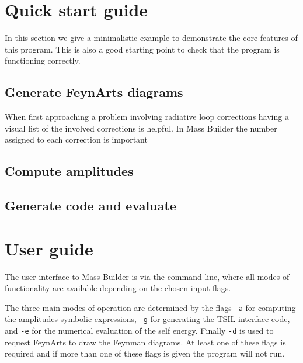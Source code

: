 \section{Quick start guide}

In this section we give a minimalistic example to demonstrate the core features of this program.  This is also a good starting point to check that the program is functioning correctly.

\subsection{Generate FeynArts diagrams}\label{generate_diagrams}

When first approaching a problem involving radiative loop corrections having a visual list of the involved corrections is helpful.  In Mass Builder the number assigned to each correction is important 


\subsection{Compute amplitudes}

\subsection{Generate code and evaluate}


\section{User guide}

The user interface to Mass Builder is via the command line, where all modes of functionality are available depending on the chosen input flags.

The three main modes of operation are determined by the flags \lstinline{-a} for computing the amplitudes symbolic expressions, \lstinline{-g} for generating the TSIL interface code, and \lstinline{-e} for the numerical evaluation of the self energy.  Finally \lstinline{-d} is used to request FeynArts to draw the Feynman diagrams.  At least one of these flags is required and if more than one of these flags is given the program will not run.

